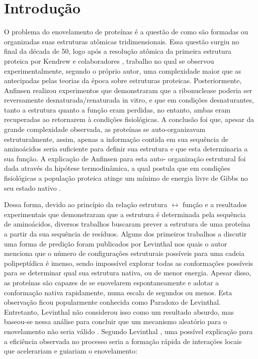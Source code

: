 \chapter{Introdução}\label{ch:introducao}

O problema do enovelamento de proteínas é a questão de como são formadas ou organizadas suas estruturas atômicas tridimensionais. Essa questão surgiu no final da década de 50, logo após a resolução atômica da primeira estrutura proteica por Kendrew e colaboradores \cite{KENDREW:1953}, trabalho no qual se observou experimentalmente, segundo o próprio autor, uma complexidade maior que as antecipadas pelas teorias da época sobre estruturas proteicas. Posteriormente, Anfinsen \cite{Anfinsen:1968} realizou experimentos que demonstraram que a ribonuclease poderia ser reversamente desnaturada/renaturada in vitro, e que em condições desnaturantes, tanto a estrutura quanto a função eram perdidas, no entanto, ambas eram recuperadas ao retornarem à condições fisiológicas. A conclusão foi que, apesar da grande complexidade observada, as proteínas se auto-organizavam estruturalmente, assim, apenas a informação contida em sua sequência de aminoácidos seria suficiente para definir sua estrutura e que esta determinaria a sua função. A explicação de Anfinsen para esta auto- organização estrutural foi dada através da hipótese termodinâmica, a qual postula que em condições fisiológicas a população proteica atinge um mínimo de energia livre de Gibbs no seu estado nativo \cite{Rose:2001}.

Dessa forma, devido ao princípio da relação estrutura $\leftrightarrow$ função e a resultados experimentais que demonstraram que a estrutura é determinada pela sequência de aminoácidos, diversos trabalhos buscaram prever a estrutura de uma proteína a partir da sua sequência de resíduos. Alguns dos primeiros trabalhos a discutir uma forma de predição foram publicados por Levinthal \cite{Levinthal:1963, Levinthal:} nos quais o autor menciona que o número de configurações estruturais possíveis para uma cadeia polipeptídica é imenso, sendo impossível explorar todas as conformações possíveis para se determinar qual sua estrutura nativa, ou de menor energia. Apesar disso, as proteínas são capazes de se enovelarem espontaneamente e adotar a conformação nativa rapidamente, numa escala de segundos ou menos. Esta observação ficou popularmente conhecida como Paradoxo de Levinthal. Entretanto, Levinthal não considerou isso como um resultado absurdo, mas baseou-se nessa análise para concluir que um mecanismo aleatório para o enovelamento não seria válido \cite{Ben-Naim:2007}. Segundo Levinthal \cite{Levinthal:}, uma possível explicação para a eficiência observada no processo seria a formação rápida de interações locais que acelerariam e guiariam o enovelamento:

